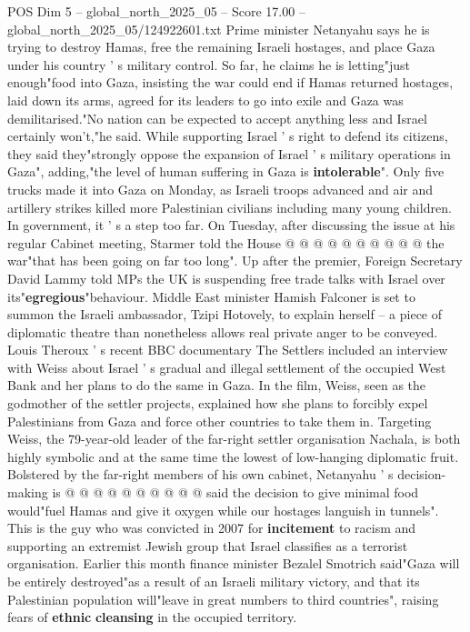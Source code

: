 \begin{textsample}{POS Dim 5 – global\_north\_2025\_05 – Score 17.00 – global\_north\_2025\_05/124922601.txt}  \label{ex:f5_pos_078}
Prime minister Netanyahu says he is trying to destroy Hamas, free the remaining Israeli hostages, and place Gaza under his country ' s military control.
So far, he claims he is letting"just enough"food into Gaza, insisting the war could end if Hamas returned hostages, laid down its arms, agreed for its leaders to go into exile and Gaza was demilitarised."No nation can be expected to accept anything less and Israel certainly won't,"he said.
While supporting Israel ' s right to defend its citizens, they said they"strongly oppose the expansion of Israel ' s military operations in Gaza", adding,"the level of human suffering in Gaza is \textbf{intolerable}".
Only five trucks made it into Gaza on Monday, as Israeli troops advanced and air and artillery strikes killed more Palestinian civilians including many young children.
In government, it ' s a step too far.
On Tuesday, after discussing the issue at his regular Cabinet meeting, Starmer told the House @ @ @ @ @ @ @ @ @ @ the war"that has been going on far too long".
Up after the premier, Foreign Secretary David Lammy told MPs the UK is suspending free trade talks with Israel over its"\textbf{egregious}"behaviour.
Middle East minister Hamish Falconer is set to summon the Israeli ambassador, Tzipi Hotovely, to explain herself -- a piece of diplomatic theatre than nonetheless allows real private anger to be conveyed.
Louis Theroux ' s recent BBC documentary The Settlers included an interview with Weiss about Israel ' s gradual and illegal settlement of the occupied West Bank and her plans to do the same in Gaza.
In the film, Weiss, seen as the godmother of the settler projects, explained how she plans to forcibly expel Palestinians from Gaza and force other countries to take them in.
Targeting Weiss, the 79-year-old leader of the far-right settler organisation Nachala, is both highly symbolic and at the same time the lowest of low-hanging diplomatic fruit.
Bolstered by the far-right members of his own cabinet, Netanyahu ' s decision-making is @ @ @ @ @ @ @ @ @ @ said the decision to give minimal food would"fuel Hamas and give it oxygen while our hostages languish in tunnels".
This is the guy who was convicted in 2007 for \textbf{incitement} to racism and supporting an extremist Jewish group that Israel classifies as a terrorist organisation.
Earlier this month finance minister Bezalel Smotrich said"Gaza will be entirely destroyed"as a result of an Israeli military victory, and that its Palestinian population will"leave in great numbers to third countries", raising fears of \textbf{ethnic} \textbf{cleansing} in the occupied territory.

\end{textsample}
